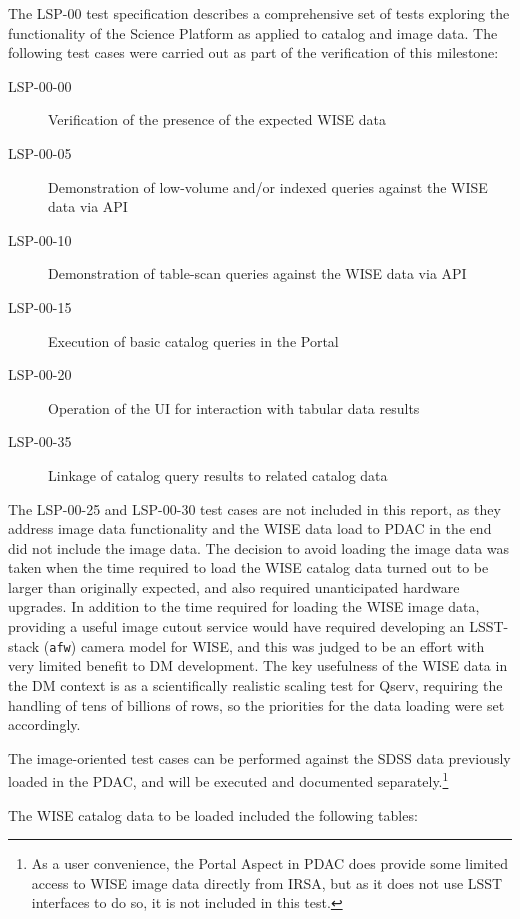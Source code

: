 \documentclass[DM,lsstdraft,STR,toc]{lsstdoc}
\begin{document}
The LSP-00 test specification describes a comprehensive set of tests exploring the functionality of the Science Platform as applied to catalog and image data.
The following test cases were carried out as part of the verification of this milestone:

\begin{description}
\item[LSP-00-00]{Verification of the presence of the expected WISE data}
\item[LSP-00-05]{Demonstration of low-volume and/or indexed queries against the WISE data via API}
\item[LSP-00-10]{Demonstration of table-scan queries against the WISE data via API}
\item[LSP-00-15]{Execution of basic catalog queries in the Portal}
\item[LSP-00-20]{Operation of the UI for interaction with tabular data results}
\item[LSP-00-35]{Linkage of catalog query results to related catalog data}
\end{description}

The LSP-00-25 and LSP-00-30 test cases are not included in this report, as they address image data functionality and the WISE data load to PDAC in the end did not include the image data.
The decision to avoid loading the image data was taken when the time required to load the WISE catalog data turned out to be larger than originally expected, and also required unanticipated hardware upgrades.
In addition to the time required for loading the WISE image data, providing a useful image cutout service would have required developing an LSST-stack (\verb|afw|) camera model for WISE, and this was judged to be an effort with very limited benefit to DM development.
The key usefulness of the WISE data in the DM context is as a scientifically realistic scaling test for Qserv, requiring the handling of tens of billions of rows, so the priorities for the data loading were set accordingly.

The image-oriented test cases can be performed against the SDSS data previously loaded in the PDAC, and will be executed and documented separately.\footnote{As a user convenience, the Portal Aspect in PDAC does provide some limited access to WISE image data directly from IRSA, but as it does not use LSST interfaces to do so, it is not included in this test.}

The WISE catalog data to be loaded included the following tables:
\end{document}
